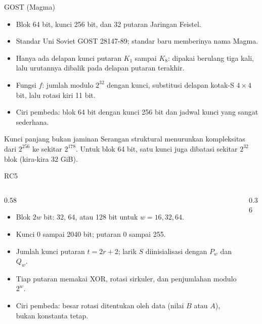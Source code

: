 \documentclass[aspectratio=169,11pt]{beamer}
\begin{document}
\begin{frame}{GOST (Magma)}
    \footnotesize
    \begin{itemize}
        \item Blok 64 bit, kunci 256 bit, dan 32 putaran Jaringan Feistel.
        \item Standar Uni Soviet GOST 28147-89; standar baru memberinya
              nama Magma.
        \item Hanya ada delapan kunci putaran $K_1$ sampai $K_8$: dipakai
              berulang tiga kali, lalu urutannya dibalik pada delapan
              putaran terakhir.
        \item Fungsi $f$: jumlah modulo $2^{32}$ dengan kunci, substitusi
              delapan kotak-S $4 \times 4$ bit, lalu rotasi kiri 11 bit.
        \item Ciri pembeda: blok 64 bit dengan kunci 256 bit dan jadwal
              kunci yang sangat sederhana.
    \end{itemize}
    \vspace{0.05cm}
    \begin{alertblock}{Kunci panjang bukan jaminan}
        \footnotesize
        Serangan struktural menurunkan kompleksitas dari $2^{256}$ ke
        sekitar $2^{178}$. Untuk blok 64 bit, satu kunci juga dibatasi
        sekitar $2^{32}$ blok (kira-kira 32 GiB).
    \end{alertblock}
\end{frame}

\begin{frame}{RC5}
    \footnotesize
    \begin{columns}[T,onlytextwidth]
        \begin{column}{0.58\textwidth}
            \begin{itemize}
                \item Blok $2w$ bit: 32, 64, atau 128 bit untuk $w = 16,
                      32, 64$.
                \item Kunci 0 sampai 2040 bit; putaran 0 sampai 255.
                \item Jumlah kunci putaran $t = 2r + 2$; larik $S$
                      diinisialisasi dengan $P_w$ dan $Q_w$.
                \item Tiap putaran memakai XOR, rotasi sirkuler, dan
                      penjumlahan modulo $2^w$.
                \item Ciri pembeda: besar rotasi ditentukan oleh data
                      (nilai $B$ atau $A$), bukan konstanta tetap.
            \end{itemize}
        \end{column}
        \begin{column}{0.36\textwidth}
            \centering
        \end{column}
    \end{columns}
\end{frame}
\end{document}
